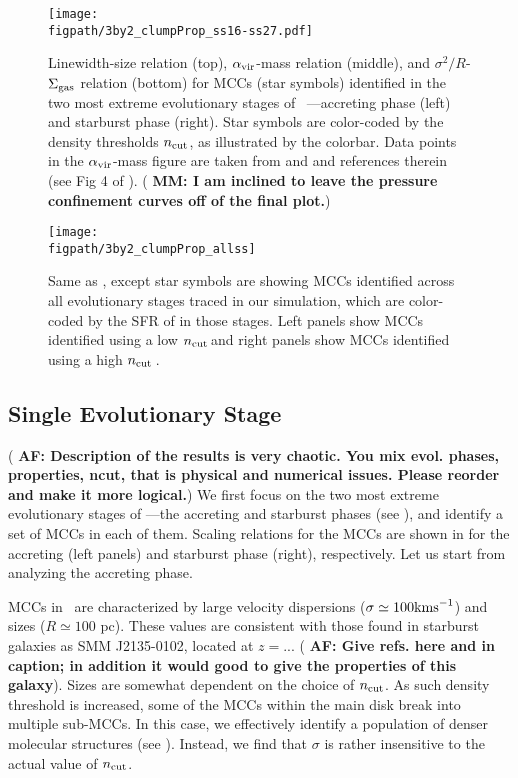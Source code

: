 \IfFileExists{emulateapjlegacy.cls}{\documentclass[iop]{emulateapjlegacy}}{\documentclass[iop]{emulateapj}}
\newcommand{\AF}[1]{({\bf \color{afcolor} AF: #1})}
\newcommand{\MM}[1]{({\bf \color{mmcolor} MM: #1})}
\def\figpath{./Fig}
\begin{document}
\begin{figure*}
\centering
\texttt{[image: \\figpath/3by2\_clumpProp\_ss16-ss27.pdf]}
\caption{
Linewidth-size relation (top), $\alpha_{\rm vir}$-mass relation
(middle), and $\sigma^2/R$-$\Sigma_{\rm gas}$ relation (bottom) for
MCCs (star symbols) identified in the two most extreme evolutionary
stages of \flower\ ---accreting phase (left) and starburst phase
(right). Star symbols are color-coded by the density thresholds
$n_{\rm cut}$, as illustrated by the colorbar.
Data points in the $\alpha_{\rm vir}$-mass figure are taken from
\citet{Kauffmann17a} and \citet{Kauffmann17b} and references therein
(see Fig 4 of \citealt{Kauffmann17b}).   \MM{I
  am inclined to leave the pressure confinement curves off of the
  final plot.}
\label{fig:larsons_single}}
\end{figure*}

\begin{figure*}
\centering
\texttt{[image: \\figpath/3by2\_clumpProp\_allss]}
\caption{Same as , except star symbols are showing MCCs identified across all evolutionary stages traced in our simulation, which are color-coded by the SFR of \flower in those stages. Left panels show MCCs identified using a low $n_{\rm cut}$\,\cc and right panels show MCCs identified using a high $n_{\rm cut}$\,\cc.
\label{fig:alpha16-28}}
\end{figure*}

\subsection{Single Evolutionary Stage}  \label{sec:singless}
\AF{Description of the results is very chaotic. You mix evol. phases, properties, ncut, that is physical and numerical issues. Please reorder and make it more logical.}
We first focus on the two most extreme evolutionary stages of \flower---the accreting and starburst phases (see ), and identify a set of MCCs in each of them. Scaling relations for the MCCs are shown in  for the accreting (left panels) and starburst phase (right), respectively. Let us start from analyzing the accreting phase.

MCCs in \flower\ are characterized by large velocity dispersions ($\sigma \simeq 100 {\rm km s}^{-1}$) and sizes ($R\simeq 100$ pc). These values are consistent with those found in starburst galaxies as SMM J2135-0102, located at $z=...$ \AF{Give refs. here and in caption; in addition it would good to give the properties of this galaxy}. 
Sizes are somewhat dependent on the choice of $n_{\rm cut}$. As such density threshold is increased, some of the MCCs within the main disk break into multiple sub-MCCs. In this case, we effectively identify a population of denser molecular structures (see ). Instead, we find that $\sigma$ is rather insensitive to the actual value of $n_{\rm cut}$. 
\end{document}

